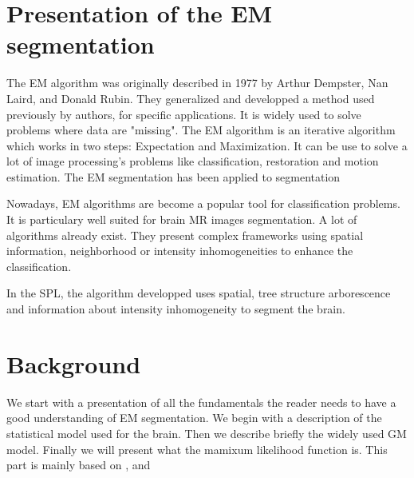 \section{Presentation of the EM segmentation}
The EM algorithm was originally described in 1977 by Arthur Dempster, Nan Laird, and Donald Rubin\cite{1}. They generalized and developped a method used previously by authors, for specific applications. It is widely used to solve problems where data are "missing". %
The EM algorithm is an iterative algorithm which works in two steps: Expectation and Maximization. It can be use to solve a lot of image processing's problems like classification, restoration\cite{3} and motion estimation\cite{2}. 
The EM segmentation has been applied to segmentation%
\par
Nowadays, EM algorithms are become a popular tool for classification problems.  It is particulary well suited for brain MR images segmentation.
A lot of algorithms already exist. They present complex frameworks using spatial information, neighborhood or intensity inhomogeneities to enhance the classification.\\
\par
In the SPL, the algorithm developped uses spatial, tree structure arborescence and information about intensity inhomogeneity to segment the brain. 
%

\section{Background}
%
We start with a presentation of all the fundamentals the reader needs to have a good understanding of EM segmentation. We begin with a description of the statistical model used for the brain. Then we describe briefly the widely used GM model. Finally we will present what the mamixum likelihood function is. This part is mainly based on \cite{4}, \cite{5} and \cite{6}
%
